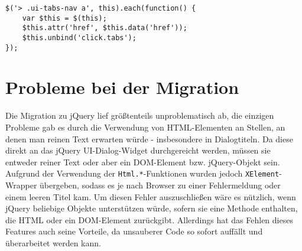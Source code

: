 \begin{lstlisting}[label=lst:static-tabs,caption=Umwandlung der Tabs in reguläre Links]
$('> .ui-tabs-nav a', this).each(function() {
    var $this = $(this);
    $this.attr('href', $this.data('href'));
    $this.unbind('click.tabs');
});
\end{lstlisting}


\section{Probleme bei der Migration}

Die Migration zu jQuery lief größtenteils unproblematisch ab, die einzigen Probleme gab es durch die
Verwendung von HTML-Elementen an Stellen, an denen man reinen Text erwarten würde - insbesondere in
Dialogtiteln. Da diese direkt an das jQuery UI-Dialog-Widget durchgereicht werden, müssen sie
entweder reiner Text oder aber ein DOM-Element bzw. jQuery-Objekt sein. Aufgrund der Verwendung der
\lstinline{Html.*}-Funktionen wurden jedoch \lstinline{XElement}-Wrapper übergeben, sodass es je
nach Browser zu einer Fehlermeldung oder einem leeren Titel kam. Um diesen Fehler auszuschließen
wäre es nützlich, wenn jQuery beliebige Objekte unterstützen würde, sofern sie eine Methode
enthalten, die HTML oder ein DOM-Element zurückgibt. Allerdings hat das Fehlen dieses Features auch
seine Vorteile, da unsauberer Code so sofort auffällt und überarbeitet werden kann.
